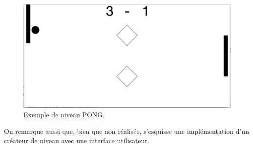 \documentclass[a4paper,10pt]{article}
\theoremstyle{definition}
\begin{document}
	\begin{figure}[!h]
  	  \begin{center}
    	    \includegraphics[width=\textwidth]{level1.png}
    	    \caption{Exemple de niveau PONG.}
    	    \label{fig:level1}
  	  \end{center}
	\end{figure}
	
	On remarque aussi que, bien que non réalisée, s'esquisse une implémentation d'un créateur de niveau avec une interface utilisateur.
\end{document}
